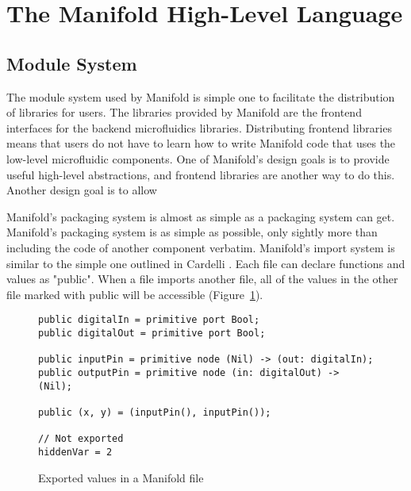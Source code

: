 \section{The Manifold High-Level Language}

\subsection{Module System}

The module system used by Manifold is simple one to facilitate the distribution of libraries for users. The libraries provided by Manifold are the frontend interfaces for the backend microfluidics libraries. Distributing frontend libraries means that users do not have to learn how to write Manifold code that uses the low-level microfluidic components. One of Manifold's design goals is to provide useful high-level abstractions, and frontend libraries are another way to do this. Another design goal is to allow 

Manifold's packaging system is almost as simple as a packaging system can get. Manifold's packaging system is as simple as possible, only sightly more than including the code of another component verbatim. Manifold's import system is similar to the simple one outlined in Cardelli \cite{Cardelli:1997:PFL:263699.263735}. Each file can declare functions and values as "public". When a file imports another file, all of the values in the other file marked with public will be accessible (Figure~\ref{fig:exports}).

\begin{figure}[!ht]
\label{fig:exports}
\caption{Exported values in a Manifold file}
\begin{lstlisting}
public digitalIn = primitive port Bool;
public digitalOut = primitive port Bool;

public inputPin = primitive node (Nil) -> (out: digitalIn);
public outputPin = primitive node (in: digitalOut) -> (Nil);

public (x, y) = (inputPin(), inputPin());

// Not exported
hiddenVar = 2
\end{lstlisting}
\end{figure}

